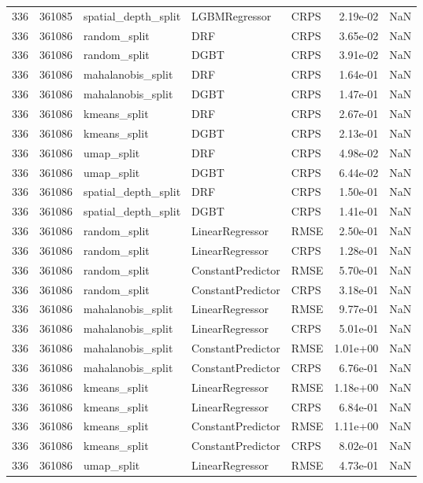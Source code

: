 \begin{tabular}{rrlllrr}
336 & 361085 & spatial\_depth\_split & LGBMRegressor & CRPS & 2.19e-02 & NaN \\
336 & 361086 & random\_split & DRF & CRPS & 3.65e-02 & NaN \\
336 & 361086 & random\_split & DGBT & CRPS & 3.91e-02 & NaN \\
336 & 361086 & mahalanobis\_split & DRF & CRPS & 1.64e-01 & NaN \\
336 & 361086 & mahalanobis\_split & DGBT & CRPS & 1.47e-01 & NaN \\
336 & 361086 & kmeans\_split & DRF & CRPS & 2.67e-01 & NaN \\
336 & 361086 & kmeans\_split & DGBT & CRPS & 2.13e-01 & NaN \\
336 & 361086 & umap\_split & DRF & CRPS & 4.98e-02 & NaN \\
336 & 361086 & umap\_split & DGBT & CRPS & 6.44e-02 & NaN \\
336 & 361086 & spatial\_depth\_split & DRF & CRPS & 1.50e-01 & NaN \\
336 & 361086 & spatial\_depth\_split & DGBT & CRPS & 1.41e-01 & NaN \\
336 & 361086 & random\_split & LinearRegressor & RMSE & 2.50e-01 & NaN \\
336 & 361086 & random\_split & LinearRegressor & CRPS & 1.28e-01 & NaN \\
336 & 361086 & random\_split & ConstantPredictor & RMSE & 5.70e-01 & NaN \\
336 & 361086 & random\_split & ConstantPredictor & CRPS & 3.18e-01 & NaN \\
336 & 361086 & mahalanobis\_split & LinearRegressor & RMSE & 9.77e-01 & NaN \\
336 & 361086 & mahalanobis\_split & LinearRegressor & CRPS & 5.01e-01 & NaN \\
336 & 361086 & mahalanobis\_split & ConstantPredictor & RMSE & 1.01e+00 & NaN \\
336 & 361086 & mahalanobis\_split & ConstantPredictor & CRPS & 6.76e-01 & NaN \\
336 & 361086 & kmeans\_split & LinearRegressor & RMSE & 1.18e+00 & NaN \\
336 & 361086 & kmeans\_split & LinearRegressor & CRPS & 6.84e-01 & NaN \\
336 & 361086 & kmeans\_split & ConstantPredictor & RMSE & 1.11e+00 & NaN \\
336 & 361086 & kmeans\_split & ConstantPredictor & CRPS & 8.02e-01 & NaN \\
336 & 361086 & umap\_split & LinearRegressor & RMSE & 4.73e-01 & NaN \\

\end{tabular}
